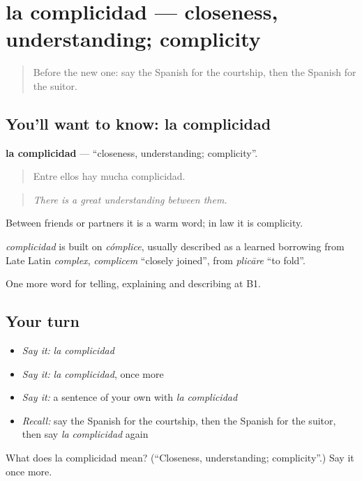 \section[la complicidad]{la complicidad — closeness, understanding; complicity}

\label{lesson:ES-C744-complicidad}



\begin{quote}
Before the new one: say the Spanish for the courtship, then the Spanish for the suitor.
\end{quote}

\subsection*{You'll want to know: la complicidad}
\textbf{la complicidad} — \textquotedblleft{}closeness, understanding; complicity\textquotedblright{}.

\begin{quote}
Entre ellos hay mucha complicidad.
\end{quote}

\begin{quote}
\emph{There is a great understanding between them.}
\end{quote}

Between friends or partners it is a warm word; in law it is complicity.

\begin{cousinweb}
\emph{complicidad} is built on \emph{cómplice}, usually described as a learned borrowing from Late Latin \emph{complex}, \emph{complicem} \textquotedblleft{}closely joined\textquotedblright{}, from \emph{plicāre} \textquotedblleft{}to fold\textquotedblright{}.
\end{cousinweb}

\begin{grammarlens}[title={What you've built}]
One more word for telling, explaining and describing at B1.
\end{grammarlens}

\subsection*{Your turn}
\begin{itemize}
\raggedright
  \item \emph{Say it:} \emph{la complicidad}
  \item \emph{Say it:} \emph{la complicidad}, once more
  \item \emph{Say it:} a sentence of your own with \emph{la complicidad}
  \item \emph{Recall:} say the Spanish for the courtship, then the Spanish for the suitor, then say \emph{la complicidad} again
\end{itemize}

\begin{tcolorbox}[breakable,colback=teal!4,colframe=teal!35!black,title={Before you move on}]
What does la complicidad mean? (\textquotedblleft{}Closeness, understanding; complicity\textquotedblright{}.) Say it once more.
\end{tcolorbox}
